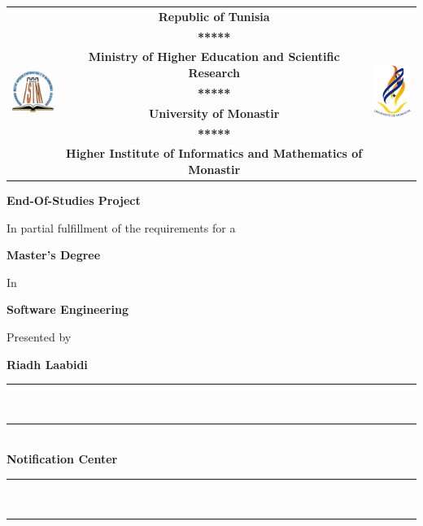 \begin{titlepage}
    \begin{center} 
        \renewcommand\arraystretch{1}
        \fontsize{9}{0.9\baselineskip}\selectfont
        \begin{tabular}{ c c c }
            \multirow[c]{7}{*}{\includegraphics[width=64px]{images/isimm.png}} & \textbf{Republic of Tunisia} & \multirow[c]{7}{*}{\includegraphics[width=56px, height=64px]{images/um.png}} \\
            & \textbf{*****} \\
            & \textbf{Ministry of Higher Education and Scientific Research} \\
            & \textbf{*****} \\
            & \textbf{University of Monastir} \\
            & \textbf{*****} \\
            & \textbf{Higher Institute of Informatics and Mathematics of Monastir}  \\
        \end{tabular}

        \vspace{1.5cm}

        \Huge\textbf{End-Of-Studies Project}

        \vspace{1cm}
        
        \normalsize In partial fulfillment of the requirements for a
        
        \Large\textbf{Master's Degree}
        
        \normalsize In

        \Large\textbf{Software Engineering}

        \normalsize Presented by

        \large{\textbf{Riadh Laabidi}}
        \vspace{0.5cm}
        
        \rule[5pt]{0.5\textwidth}{0.5px}\\
        \vspace{-16px}
        \rule[10pt]{0.5\textwidth}{2.5px} \\
        \LARGE{\textbf{Notification Center}} \\
        \rule[5pt]{0.5\textwidth}{0.5px}\\   
        \vspace{-15px}
        \rule[10pt]{0.5\textwidth}{2.5px} \\


\end{center}
\end{titlepage}

